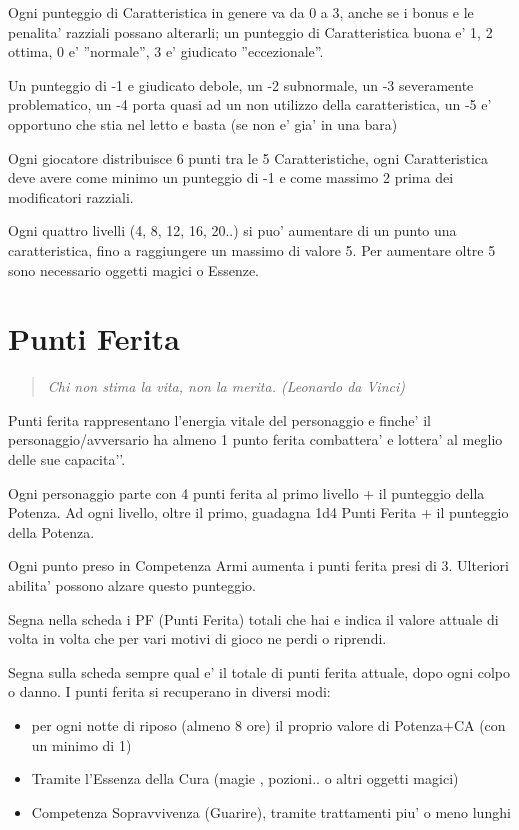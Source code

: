 \documentclass[a4paper,11pt,twoside,openany]{book}
\begin{document}
	\smallskip
	
	Ogni punteggio di Caratteristica in genere va da 0 a 3, anche se i bonus e le penalita' razziali possano alterarli; un punteggio di Caratteristica buona e' 1, 2 ottima, 0 e' ''normale'', 3 e' giudicato ''eccezionale''.
	
	Un punteggio di -1 e giudicato debole, un -2 subnormale, un -3 severamente problematico, un -4 porta quasi ad un non utilizzo della caratteristica, un -5 e' opportuno che stia nel letto e basta (se non e' gia' in una bara)
	
	Ogni giocatore distribuisce 6 punti tra le 5 Caratteristiche, ogni Caratteristica deve avere come minimo un punteggio di -1 e come massimo 2 prima dei modificatori razziali.
	
	Ogni quattro livelli (4, 8, 12, 16, 20..) si puo' aumentare di un punto una caratteristica, fino a raggiungere un massimo di valore 5. Per aumentare oltre 5 sono necessario oggetti magici o Essenze.
	
	
	\section{Punti Ferita}
	
	\begin{quote}\textit{Chi non stima la vita, non la merita. (Leonardo da Vinci)
	}\end{quote}
	
	
	Punti ferita rappresentano l’energia vitale del personaggio e finche’ il personaggio/avversario ha almeno 1 punto ferita combattera’ e lottera’ al meglio delle sue capacita'’.
	
	Ogni personaggio parte con 4 punti ferita al primo livello + il punteggio della Potenza.
	Ad ogni livello, oltre il primo, guadagna 1d4 Punti Ferita + il punteggio della Potenza. 
	
	Ogni punto preso in Competenza Armi aumenta i punti ferita presi di 3. Ulteriori abilita’ possono alzare questo punteggio.
	
	Segna nella scheda i PF (Punti Ferita) totali che hai e indica il valore attuale di volta in volta che per vari motivi di gioco ne perdi o riprendi.
	
	Segna sulla scheda sempre qual e’ il totale di punti ferita attuale, dopo ogni colpo o danno.
	I punti ferita si recuperano in diversi modi:
	
	\begin{itemize}
		\item 
		per ogni notte di riposo (almeno 8 ore) il proprio valore di Potenza+CA (con un minimo di 1) 
		\item
		Tramite l'Essenza della Cura (magie , pozioni.. o altri oggetti magici) 
		\item 
		Competenza Sopravvivenza (Guarire), tramite trattamenti piu' o meno lunghi 
	\end{itemize}
	
\end{document}
